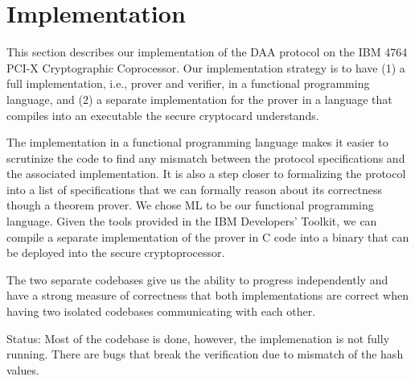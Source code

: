 \section{Implementation}

\begin{comment}
	\emph{EE:}
	We've two implementations.
	(implementation strategy) having two codebases using two different languages: - confidence that each implementation was correct - ability to work concurrently and with individual time constraints.
	cons: increased debuging time: Debug both in isolation, then debug their communication.
	We overshot (debugging in isolation is our current status). took much time to debug what was going wrong and we ended up with two buggy codebases. (The ML code is complete. The C code is incomplete. Both have bugs in isolation. We've yet to reach integration bugs.)
	
	!!!Things are broken!!!
\end{comment}
\fi

This section describes our implementation of the DAA protocol on the IBM 4764
PCI-X Cryptographic Coprocessor. Our implementation strategy is to have (1) a
full implementation, i.e., prover and verifier, in a functional programming
language, and (2) a separate implementation for the prover in a language that
compiles into an executable the secure cryptocard understands.

The implementation in a functional programming language makes it easier to
scrutinize the code to find any mismatch between the protocol specifications and
the associated implementation. It is also a step closer to formalizing the
protocol into a list of specifications that we can formally reason about its
correctness though a theorem prover. We chose ML to be our functional
programming language. Given the tools provided in the IBM Developers' Toolkit,
we can compile a separate implementation of the prover in C code into a binary
that can be deployed into the secure cryptoprocessor.

The two separate codebases give us the ability to progress independently and
have a strong measure of correctness that both implementations are correct when
having two isolated codebases communicating with each other.

Status: Most of the codebase is done, however, the implemenation is not fully
running. There are bugs that break the verification due to mismatch of the hash
values.